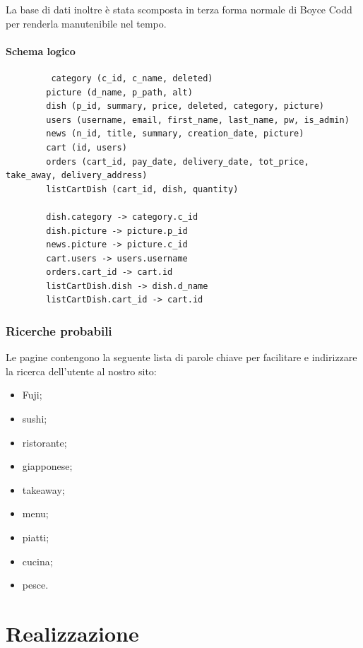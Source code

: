 \documentclass{template}
\begin{document}
	La base di dati inoltre è stata scomposta in terza forma normale di Boyce Codd per renderla manutenibile nel tempo.

	\paragraph{Schema logico}
	\begin{lstlisting}
	     category (c_id, c_name, deleted)
        picture (d_name, p_path, alt)
        dish (p_id, summary, price, deleted, category, picture)
        users (username, email, first_name, last_name, pw, is_admin)
        news (n_id, title, summary, creation_date, picture)
        cart (id, users)
        orders (cart_id, pay_date, delivery_date, tot_price, take_away, delivery_address)
        listCartDish (cart_id, dish, quantity)

        dish.category -> category.c_id
        dish.picture -> picture.p_id
        news.picture -> picture.c_id
        cart.users -> users.username
        orders.cart_id -> cart.id
        listCartDish.dish -> dish.d_name
        listCartDish.cart_id -> cart.id
    \end{lstlisting}
    
	\subsubsection{Ricerche probabili}
    Le pagine contengono la seguente lista di parole chiave per facilitare e indirizzare la ricerca dell'utente al nostro sito:
	\begin{itemize}
	\item Fuji;
	\item sushi;
	\item ristorante;
	\item giapponese;
	\item takeaway;
	\item menu;
	\item piatti;
	\item cucina;
	\item pesce.
	\end{itemize}

	\section{Realizzazione}
\end{document}
